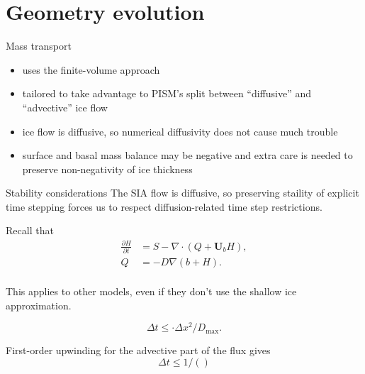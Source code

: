 \documentclass[hide notes,intlimits]{beamer}
\begin{document}

\section{Geometry evolution}
\label{sec:geometry-evolution}

\begin{frame}{Mass transport}
  \begin{itemize}
  \item uses the finite-volume approach
  \item tailored to take advantage to PISM's split between
    ``diffusive'' and ``advective'' ice flow
  \item ice flow is diffusive, so numerical diffusivity does not cause
    much trouble
  \item surface and basal mass balance may be negative and extra care
    is needed to preserve non-negativity of ice thickness
  \end{itemize}
\end{frame}


\begin{frame}{Stability considerations}
  The SIA flow is diffusive, so preserving staility of explicit time
  stepping forces us to respect diffusion-related time step
  restrictions.

  Recall that
  \begin{align}
    \label{eq:2}
    \frac{\partial H}{\partial t} &= S - \nabla \cdot (Q + \mathbf{U}_b H),\\
    Q &= -D \nabla (b + H).\\
  \end{align}

  This applies to other models, even if they don't use the shallow ice
  approximation.

  \begin{equation}
    \label{eq:3}
    \Delta t \le \cdot \Delta x^{2} / D_{\text{max}}.
  \end{equation}

  First-order upwinding for the advective part of the flux gives
  \begin{equation}
    \label{eq:6}
    \Delta t \le 1 / ()
  \end{equation}
\end{frame}
\end{document}
